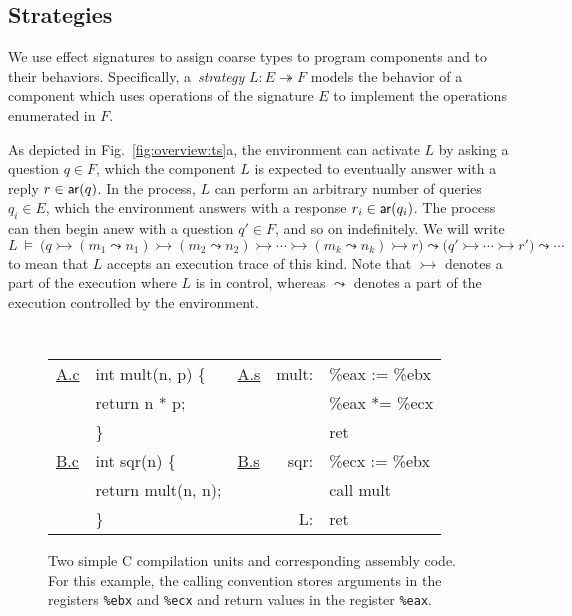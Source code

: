 
\subsection{Strategies} \label{sec:strat} %

We use effect signatures to assign coarse types
to program components and to their behaviors.
Specifically,
a~\emph{strategy} $L : E \twoheadrightarrow F$
models the behavior of a component which
uses operations of the signature $E$ to
implement the operations enumerated in $F$.

As depicted in Fig.~\ref{fig:overview:ts}a,
the environment can activate $L$ by asking a question $q \in F$,
which the component $L$ is expected to eventually answer
with a reply $r \in  \mathsf{ar} (q)$.
In the process,
$L$ can perform an arbitrary number of queries $q_i \in E$,
which the environment answers with a response $r_i \in  \mathsf{ar} (q_i)$.
The process can then begin anew with a question $q' \in F$,
and so on indefinitely.
We will write
\[
  L \:\vDash\: \big(q
    \rightarrowtail (m_1 \leadsto n_1)
    \rightarrowtail (m_2 \leadsto n_2)
    \rightarrowtail \cdots
    \rightarrowtail (m_k \leadsto n_k)
    \rightarrowtail r \big)
  \leadsto \big(q'
    \rightarrowtail \cdots
    \rightarrowtail r' \big)
  \leadsto \cdots
\]
to mean that $L$ accepts an execution trace of this kind.
Note that $\rightarrowtail$ denotes a part of the execution
where $L$ is in control,
whereas $\leadsto$ denotes a part of the execution
controlled by the environment.

\begin{figure} %
  \figsize
  \centering
  \tt
  {\footnotesize
  \begin{tabular}{ll lr@{\ }l}
    \hline
    \underline{A.c} & int mult(n, p) \{ &
    \underline{A.s} & mult: & \%eax := \%ebx \\
                    & \quad return n * p; &
                    & & \%eax *= \%ecx \\
                    & \} &
                    & & ret \\
    \hline
    \underline{B.c} & int sqr(n) \{ &
    \underline{B.s} & sqr: & \%ecx := \%ebx \\
                    & \quad return mult(n, n); &
                    & & call mult \\
                    & \} &
                    & L: & ret \\
    \hline
  \end{tabular}
  }
  \caption{Two simple C compilation units and corresponding assembly code.
    For this example,
    the calling convention stores arguments in
    the registers
    \texttt{\%ebx} and \texttt{\%ecx}
    and return values in
    the register
    \texttt{\%eax}.}
  \label{fig:abc}
\end{figure}

